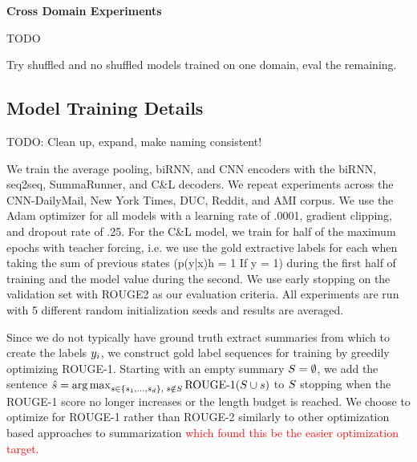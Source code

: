 \textbf{Cross Domain Experiments}

TODO

Try shuffled and no shuffled models trained on one domain, eval the remaining.











\subsection{Model Training Details}

TODO: Clean up, expand, make naming consistent!

We train the average pooling, biRNN, and CNN encoders with the biRNN, 
seq2seq, SummaRunner, and C\&L decoders. We repeat experiments across the 
CNN-DailyMail, New York Times, DUC, Reddit, and AMI corpus. 
We use the Adam optimizer for all models with a learning rate of .0001, 
gradient clipping, and dropout rate of .25. 
For the C\&L model, we train for half of the maximum epochs with teacher 
forcing, i.e. we use the gold extractive labels for each when taking the sum 
of previous states (p(y|x)h = 1 If y = 1) during the first half of training 
and the model value during the second. We use early stopping on the validation
set with ROUGE2 as our evaluation criteria. All experiments are run with 5 
different random initialization seeds and results are averaged.

Since we do not typically have ground truth extract summaries from which to
create the labels $y_i$, we construct gold label sequences for training
by greedily optimizing ROUGE-1. Starting with an empty summary $\summary = 
\null \emptyset$, we add the sentence $\hat{s} = 
{\operatorname*{arg\,max}}_{ s \in \{s_1, \ldots, s_{d}\},
\; s \notin S} \operatorname{ROUGE-1}(S \cup s)$
to $S$ stopping when the ROUGE-1 score no longer increases or the 
length budget is reached. We choose to optimize for ROUGE-1 rather than 
ROUGE-2 similarly to other optimization based approaches to summarization 
\textcolor{red}{
\cite{durrett2016learning,sipos2012large,nallapati2017summarunner} which found this
be the easier optimization target.}





